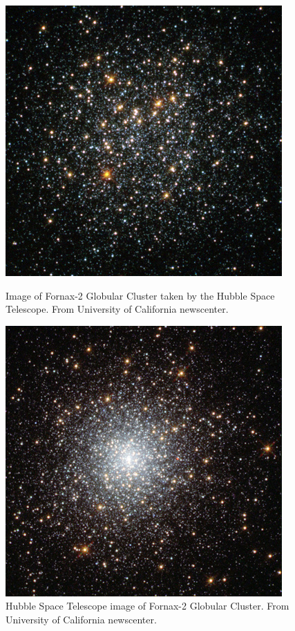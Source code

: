 \begin{figure}[H]
  \centering
  \begin{minipage}[b]{0.45\textwidth}
    \includegraphics[width=\textwidth]{images/fornax-2-400.jpg}
    \caption[Hubble image of Fornax-2 Globular Cluster]{Image of Fornax-2 Globular Cluster taken by the Hubble Space Telescope. From University of California newscenter.}
  \end{minipage}
  \hfill
  \begin{minipage}[b]{0.45\textwidth}
    \includegraphics[width=\textwidth]{images/fornax-3-400.jpg}
    \caption[Hubble Space Telescope image of Fornax-3 Globular Cluster]{Hubble Space Telescope image of Fornax-2 Globular Cluster. From University of California newscenter.}
  \end{minipage}
\end{figure}

